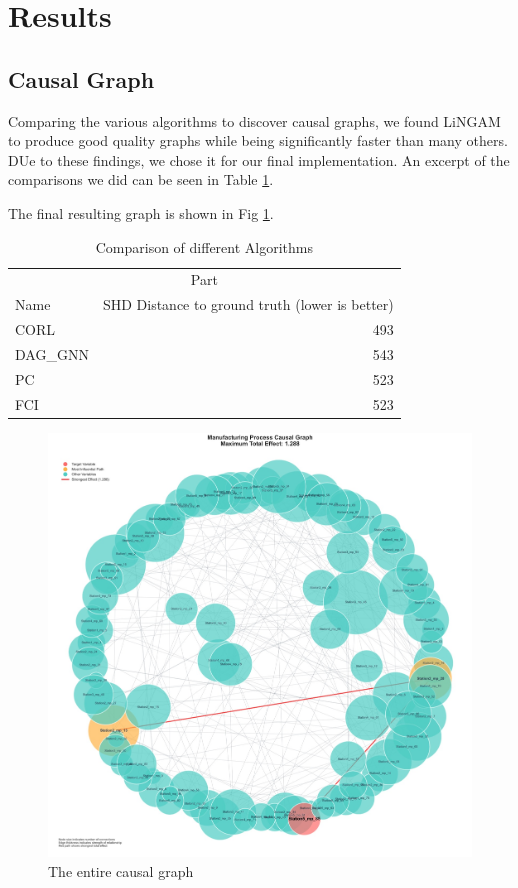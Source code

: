 \documentclass{article}
\begin{document}
    \section{Results} %

    \subsection{Causal Graph}

    Comparing the various algorithms to discover causal graphs, we found LiNGAM to produce good quality graphs while being significantly faster than many others. DUe to these findings, we chose it for our final implementation. An excerpt of the comparisons we did can be seen in Table \ref{comparisonSHD}.

    The final resulting graph is shown in Fig \ref{fig:wholegraph}.
    
    \begin{table}
		\caption{Comparison of different Algorithms}
		\label{comparisonSHD}
		\centering
		\begin{tabular}{lr}
			\toprule
			\multicolumn{2}{c}{Part}                   \\
			\cmidrule(r){1-2}
			Name     & SHD Distance to ground truth (lower is better)  \\
			\midrule
			CORL  & 493       \\
			DAG\_GNN & 543    \\
			PC & 523     \\
            FCI  & 523 \\
			\bottomrule
		\end{tabular}
	\end{table}

     \begin{figure}
         \centering
         \includegraphics[width=0.75\linewidth]{whole_graph_result.jpeg}
         \caption{The entire causal graph}
         \label{fig:wholegraph}
     \end{figure}
    
\end{document}
